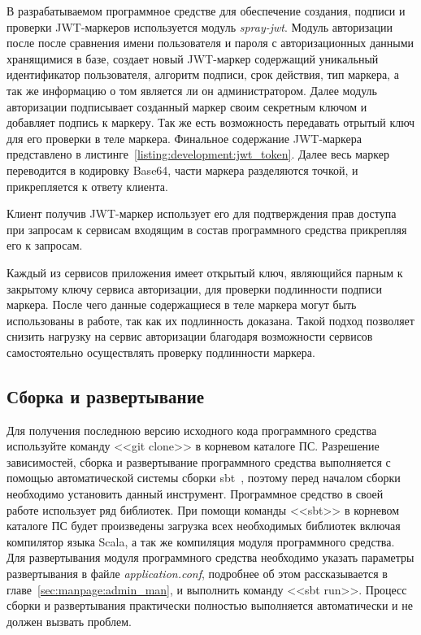 В разрабатываемом программное средстве для обеспечение создания, подписи и проверки JWT-маркеров используется модуль \emph{spray-jwt}. Модуль авторизации после после сравнения имени пользователя и пароля с авторизационных данными хранящимися в базе, создает новый JWT-маркер содержащий уникальный идентификатор пользователя, алгоритм подписи, срок действия, тип маркера, а так же информацию о том является ли он администратором. Далее модуль авторизации подписывает созданный маркер своим секретным ключом и добавляет подпись к маркеру. Так же есть возможность передавать отрытый ключ для его проверки в теле маркера.
Финальное содержание JWT-маркера представлено в листинге~\ref{listing:development:jwt_token}. Далее весь маркер переводится в кодировку Base64, части маркера разделяются точкой, и прикрепляется к ответу клиента.


Клиент получив JWT-маркер использует его для подтверждения прав доступа при запросам к сервисам входящим в состав программного средства прикрепляя его к запросам.

Каждый из сервисов приложения имеет открытый ключ, являющийся парным к закрытому ключу сервиса авторизации, для проверки подлинности подписи маркера. После чего данные содержащиеся в теле маркера могут быть использованы в работе, так как их подлинность доказана. Такой подход позволяет снизить нагрузку на сервис авторизации благодаря возможности сервисов самостоятельно осуществлять проверку подлинности маркера.

\subsection{Сборка и развертывание}
Для получения последнюю версию исходного кода программного средства используйте команду <<git clone>> в корневом каталоге ПС. Разрешение зависимостей, сборка и развертывание программного средства выполняется с помощью автоматической системы сборки sbt~\cite{sbt}, поэтому перед началом сборки необходимо установить данный инструмент. Программное средство в своей работе использует ряд библиотек. При помощи команды <<sbt>> в корневом каталоге ПС будет произведены загрузка всех необходимых библиотек включая компилятор языка Scala, а так же компиляция модуля программного средства.
Для развертывания модуля программного средства необходимо указать параметры развертывания в файле \emph{application.conf}, подробнее об этом рассказывается в главе~\ref{sec:manpage:admin_man}, и выполнить команду <<sbt run>>. Процесс сборки и развертывания практически полностью выполняется автоматически и не должен вызвать проблем.

